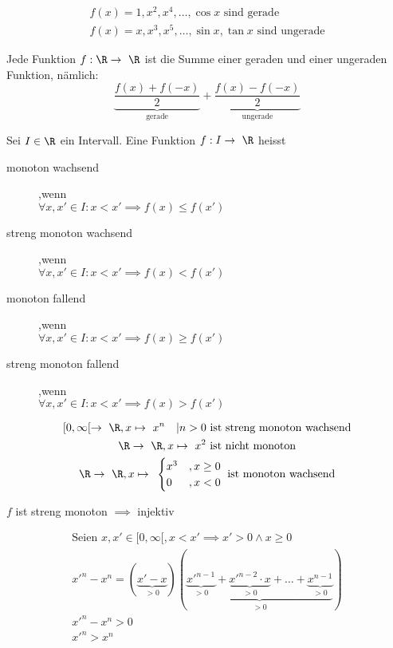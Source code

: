 \begin{bsp*}
	\begin{gather*}
		f(x) = 1 , x^2 , x^4 , \dotsc , \cos x \text{ sind gerade} \\
		f(x) = x , x^3 , x^5 , \dotsc , \sin x , \tan x \text{ sind ungerade}
	\end{gather*}
\end{bsp*}
\begin{bem}
	Jede Funktion $f: \R \rightarrow \R$ ist die Summe einer geraden und einer ungeraden Funktion, nämlich:\\
	\[ \underbrace{\frac{f(x) + f(-x)}{2}}_{\text{gerade}} + \underbrace{\frac{f(x) - f(-x)}{2}}_{\text{ungerade}} \]
\end{bem}
\begin{def*}[note = monoton , index = monoton]
	Sei $I \in \R$ ein Intervall.
	Eine Funktion $f: I \rightarrow \R$ heisst
	\begin{description}
		\item[monoton wachsend] ,wenn \\
			$\forall x , x' \in I : x < x' \implies f(x) \leq f(x')$
		\item[streng monoton wachsend] ,wenn \\
			$\forall x , x' \in I : x < x' \implies f(x) < f(x')$
		\item[monoton fallend] ,wenn \\
			$\forall x , x' \in I : x < x' \implies f(x) \geq f(x')$
		\item[streng monoton fallend] ,wenn \\
			$\forall x , x' \in I : x < x' \implies f(x) > f(x')$
	\end{description}
\end{def*}
\begin{bsp*}
	\begin{gather*}
		[0,\infty[ \rightarrow \R , x \mapsto x^n \quad | n > 0 \text{ ist streng monoton wachsend}\\
		\R \rightarrow \R , x \mapsto x^2 \text{ ist nicht monoton}\\
		\R \rightarrow \R , x \mapsto \begin{cases}
			x^3	&, x \geq 0	\\
			0	&, x < 0	
		\end{cases} \text{ ist monoton wachsend}
	\end{gather*}
\end{bsp*}
\begin{bem}
	$f$ ist streng monoton $\implies$ injektiv
\end{bem}
\begin{bsp*}
	\begin{gather*}
		\text{Seien } x, x' \in [0,\infty[ , x < x' \implies x' > 0 \wedge x \geq 0 \\
		{x'}^n - x^n = ( \underbrace{x' - x}_{>0} )( \underbrace{\underbrace{{x'}^{n-1}}_{>0} + \underbrace{{x'}^{n-2} \cdot x}_{>0} + \dots + \underbrace{x^{n-1}}_{>0}}_{>0} ) \\
		{x'}^n - x^n > 0 \\
		{x'}^n > x^n
	\end{gather*}
\end{bsp*}

